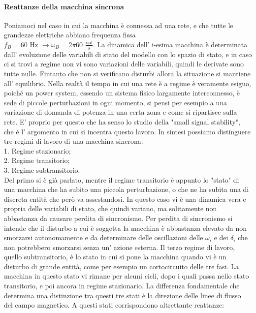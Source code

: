 \documentclass[Lau,noexaminfo]{sapthesis}
\begin{document}
	\paragraph{Reattanze della macchina sincrona}
	Poniamoci nel caso in cui la macchina è connessa ad una rete, e che tutte le grandezze elettriche abbiano frequenza fissa \\$f_B=60$ Hz $\rightarrow \omega_B=2\pi60$ $\frac{\text{rad}}{s}$. La dinamica dell' i-esima macchina è determinata dall' evoluzione delle variabili di stato del modello con lo spazio di stato, e in caso ci si trovi a regime non vi sono variazioni delle variabili, quindi le derivate sono tutte nulle. Fintanto che non si verificano disturbi allora la situazione si mantiene all' equilibrio. Nella realtà il tempo in cui una rete è a regime è veramente esiguo, poiché un power system, essendo un sistema fisico largamente interconnesso, è sede di piccole perturbazioni in ogni momento, si pensi per esempio a una variazione di domanda di potenza in una certa zona e come si ripartisce sulla rete. E' proprio per questo che ha senso lo studio della "small signal stability", che è l' argomento in cui si incentra questo lavoro. In sintesi possiamo distinguere tre regimi di lavoro di una macchina sincrona:\\
	1. Regime stazionario;\\
	2. Regime transitorio;\\
	3. Regime subtransitorio.\\
	Del primo si è già parlato, mentre il regime transitorio è appunto lo "stato" di una macchina che ha subito una piccola perturbazione, o che ne ha subita una di discreta entità che però va assestandosi. In questo caso vi è una dinamica vera e propria delle variabili di stato, che quindi variano, ma solitamente non abbastanza da causare perdita di sincronismo. Per perdita di sincronismo si intende che il disturbo a cui è soggetta la macchina è abbastanza elevato da non smorzarsi autonomamente e da determinare delle oscillazioni delle $\omega_i$ e dei $\delta_i$ che non potrebbero smorzarsi senza un' azione esterna. Il terzo regime di lavoro, quello subtransitorio, è lo stato in cui si pone la macchina quando vi è un disturbo di grande entità, come per esempio un cortocircuito delle tre fasi. La macchina in questo stato vi rimane per alcuni cicli, dopo i quali passa nello stato transitorio, e poi ancora in regime stazionario. La differenza fondamentale che determina una distinzione tra questi tre stati è la direzione delle linee di flusso del campo magnetico. A questi stati corrispondono altrettante reattanze:\\
\end{document}
